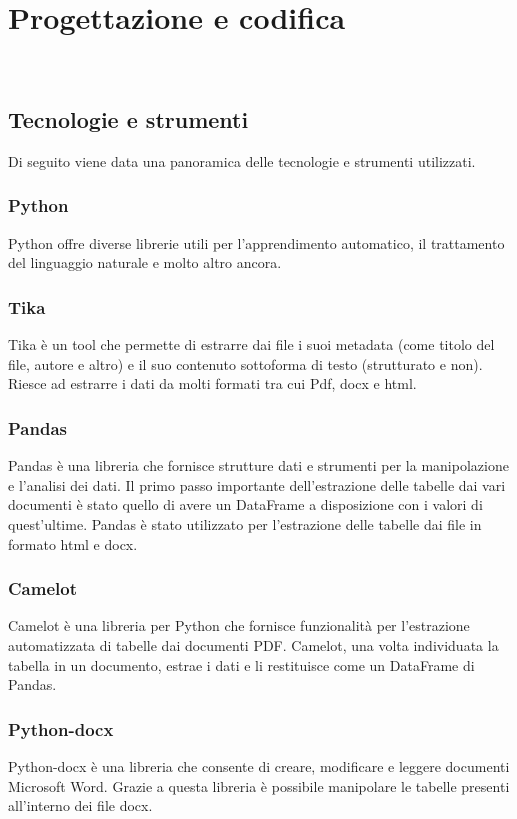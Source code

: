 \chapter{Progettazione e codifica}
\label{cap:progettazione-codifica}

\\

\section{Tecnologie e strumenti}
\label{sec:tecnologie-strumenti}

Di seguito viene data una panoramica delle tecnologie e strumenti utilizzati.
\subsection{Python}
Python offre diverse librerie utili per l'apprendimento automatico, il trattamento del linguaggio naturale e molto altro ancora.
\subsection{Tika}
\label{subsec:tika}
Tika è un tool che permette di estrarre dai file i suoi metadata (come titolo del file, autore e altro) e il suo contenuto sottoforma di testo (strutturato e non).
Riesce ad estrarre i dati da molti formati tra cui Pdf, docx e html.
\subsection{Pandas}
Pandas è una libreria che fornisce strutture dati e strumenti per la manipolazione e l'analisi dei dati.
Il primo passo importante dell'estrazione delle tabelle dai vari documenti è stato quello di avere un DataFrame a disposizione con i valori di quest'ultime. 
Pandas è stato utilizzato per l'estrazione delle tabelle dai file in formato html e docx.
\subsection{Camelot}
Camelot è una libreria per Python che fornisce funzionalità per l'estrazione automatizzata di tabelle dai documenti PDF.
Camelot, una volta individuata la tabella in un documento, estrae i dati e li restituisce come un DataFrame di Pandas.
\subsection{Python-docx}
Python-docx è una libreria che consente di creare, modificare e leggere documenti Microsoft Word.
Grazie a questa libreria è possibile manipolare le tabelle presenti all'interno dei file docx.
